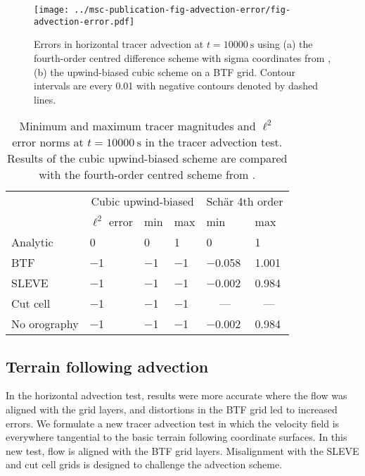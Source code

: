 \documentclass[twocol]{ametsoc}
\begin{document}
\begin{figure}
	\centering
	\texttt{[image: ../msc-publication-fig-advection-error/fig-advection-error.pdf]}
	\caption{Errors in horizontal tracer advection at \(t = \SI{10000}{\second}\) using (a) the fourth-order centred difference scheme with sigma coordinates from \citet{schaer2002}, (b) the upwind-biased cubic scheme on a BTF grid.  Contour intervals are every 0.01 with negative contours denoted by dashed lines.}
	\label{fig:advection-error}
\end{figure}

\begin{table}[t]
	\caption{ Minimum and maximum tracer magnitudes and \(\ell^2\) error norms at \(t = \SI{10000}{\second}\) in the tracer advection test.  Results of the cubic upwind-biased scheme are compared with the fourth-order centred scheme from \citet{schaer2002}.}
\label{tab:advection}
%
\centering
\footnotesize
\begin{tabular}{ l l l l l l }
\hline\hline
& \multicolumn{3}{c}{Cubic upwind-biased} & \multicolumn{2}{c}{Sch\"ar 4th order} \\
& \(\ell^2\) error & min & max & min & max \\
\hline
Analytic  & 0 & 0 & 1 & 0 & 1 \\
BTF 	  & \num{-1} & \num{-1} & \num{-1} & \num{-0.058} & \num{1.001} \\
SLEVE 	  & \num{-1} & \num{-1} & \num{-1} & \num{-0.002} & \num{0.984} \\
Cut cell  & \num{-1} & \num{-1} & \num{-1} & \multicolumn{1}{c}{---} & \multicolumn{1}{c}{---} \\
No orography & \num{-1} & \num{-1} & \num{-1} & \num{-0.002} & \num{0.984} \\
\hline
\end{tabular}
\end{table}

\subsection{Terrain following advection}
In the horizontal advection test, results were more accurate where the flow was aligned with the grid layers, and distortions in the BTF grid led to increased errors.  We formulate a new tracer advection test in which the velocity field is everywhere tangential to the basic terrain following coordinate surfaces.  In this new test, flow is aligned with the BTF grid layers.  Misalignment with the SLEVE and cut cell grids is designed to challenge the advection scheme.
\end{document}
